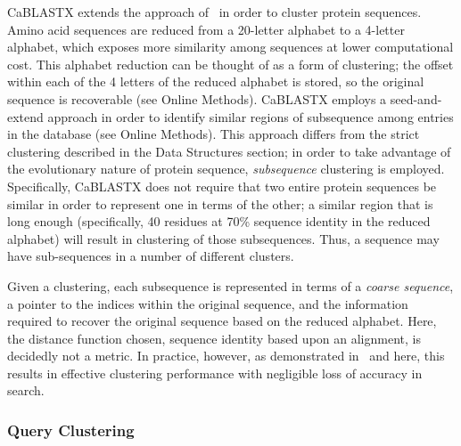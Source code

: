 \documentclass[review,preprint,12pt]{elsarticle}
\renewcommand{\cite}{\citep} %
\theoremstyle{definition}
\theoremstyle{remark}
\numberwithin{equation}{section}
\begin{document}
CaBLASTX extends the approach of~\cite{daniels2013compressive} in order to 
cluster protein sequences.
Amino acid sequences are reduced from a 20-letter alphabet to a 4-letter
alphabet, which exposes more similarity among sequences at lower computational
cost.
This alphabet reduction can be thought of as a form of clustering; the offset 
within each of the 4 letters of the reduced alphabet is stored, so the original
sequence is recoverable (see Online Methods).
CaBLASTX employs a seed-and-extend approach in order to identify similar regions
of subsequence among entries in the database (see Online Methods).
This approach differs from the strict clustering described in the Data 
Structures section; in order to take advantage of the evolutionary nature of
protein sequence, \emph{subsequence} clustering is employed.
Specifically, CaBLASTX does not require that two entire protein sequences be 
similar in order to represent one in terms of the other; a similar region that 
is long enough (specifically, 40 residues at 70\% sequence identity in the 
reduced alphabet) will result in clustering of those subsequences. 
Thus, a sequence may have sub-sequences in a number of different clusters.

Given a clustering, each subsequence is represented in terms of a 
\emph{coarse sequence}, a pointer to the indices within the original sequence,
and the information required to recover the original sequence based on the
reduced alphabet.
Here, the distance function chosen, sequence identity based upon an alignment,
is decidedly not a metric.
In practice, however, as demonstrated in~\cite{daniels2013compressive} and 
here, this results in effective clustering performance with negligible loss of 
accuracy in search.

\subsubsection{Query Clustering}
\end{document}
